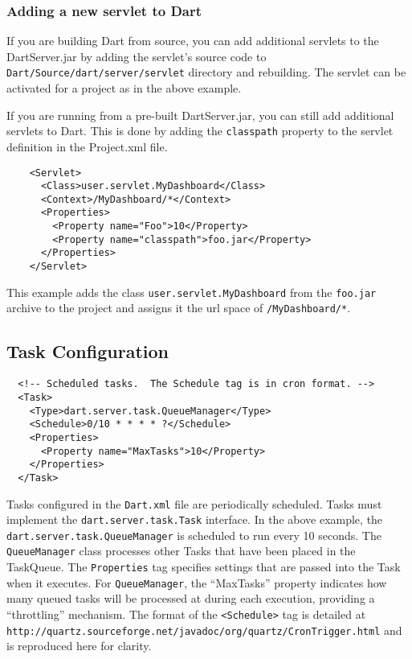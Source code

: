 \documentclass{InsightBook}
\newcommand{\xmltag}[1]{\texttt{<#1>}}
\newcommand{\filename}[1]{\texttt{#1}}
\begin{document}
\subsubsection{Adding a new servlet to Dart}
\label{Sec:UserServlet}

If you are building Dart from source, you can add additional servlets 
to the DartServer.jar by adding the servlet's source code to 
\filename{Dart/Source/dart/server/servlet} directory and rebuilding.  The
servlet can be activated for a project as in the above example.

If you are running from a pre-built DartServer.jar, you can still add
additional servlets to Dart. This is done by adding the \texttt{classpath} 
property to the servlet definition in the Project.xml file.
\begin{verbatim}
    <Servlet>
      <Class>user.servlet.MyDashboard</Class>
      <Context>/MyDashboard/*</Context>
      <Properties>
        <Property name="Foo">10</Property>
        <Property name="classpath">foo.jar</Property>
      </Properties>
    </Servlet>
\end{verbatim}

This example adds the class \texttt{user.servlet.MyDashboard} from the \filename{foo.jar} 
archive to the project and assigns it the url space of \texttt{/MyDashboard/*}.

\subsection{Task Configuration}
\begin{verbatim}
  <!-- Scheduled tasks.  The Schedule tag is in cron format. -->
  <Task>
    <Type>dart.server.task.QueueManager</Type>
    <Schedule>0/10 * * * * ?</Schedule>
    <Properties>
      <Property name="MaxTasks">10</Property>
    </Properties>
  </Task>
\end{verbatim}

Tasks configured in the \filename{Dart.xml} file are periodically
scheduled.  Tasks must implement the \texttt{dart.server.task.Task}
interface.  In the above example, the
\texttt{dart.server.task.QueueManager} is scheduled to run every 10
seconds.  The \texttt{QueueManager} class processes other Tasks that have been
placed in the TaskQueue.  The \texttt{Properties} tag specifies
settings that are passed into the Task when it executes.  For
\texttt{QueueManager}, the ``MaxTasks'' property indicates how many
queued tasks will be processed at during each execution, providing a
``throttling'' mechanism.  The format of the \xmltag{Schedule} tag
is detailed at
\texttt{http://quartz.sourceforge.net/javadoc/org/quartz/CronTrigger.html}
and is reproduced here for clarity.
\end{document}
